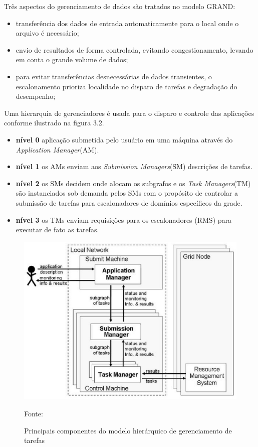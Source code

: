 Três aspectos do gerenciamento de dados são tratados no modelo GRAND:

\begin{itemize}
	\item transferência dos dados de entrada automaticamente para o local onde o arquivo é necessário;
	\item envio de resultados de forma controlada, evitando congestionamento, levando em conta o grande volume de dados;
	\item para evitar transferências desnecessárias de dados transientes, o escalonamento prioriza localidade no disparo de tarefas e degradação do desempenho;
\end{itemize}

Uma hierarquia de gerenciadores é usada para o disparo e controle das aplicações conforme ilustrado na figura 3.2.

\begin{itemize}
	\item \textbf{nível 0} aplicação submetida pelo usuário em uma máquina através do \emph{Application Manager}(AM).
	\item \textbf{nível 1} os AMs enviam aos \emph{Submission Managers}(SM) descrições de tarefas.
	\item \textbf{nível 2} os SMs decidem onde alocam os subgrafos e os \emph{Task Managers}(TM) são instanciados sob demanda pelos SMs com o propósito de controlar a submissão de tarefas para escalonadores de domínios específicos da grade.
	\item \textbf{nível 3} os TMs enviam requisições para os escalonadores (RMS) para executar de fato as tarefas.
\end{itemize}

\begin{figure}[htb]
\begin{center}
\includegraphics[scale=0.55]{./img/grand.eps}
\caption{Principais componentes do modelo hierárquico de gerenciamento de tarefas}
\label{fig:Modelo_Grand}
Fonte: \cite{Mangan2006}
\end{center}
\end{figure}

